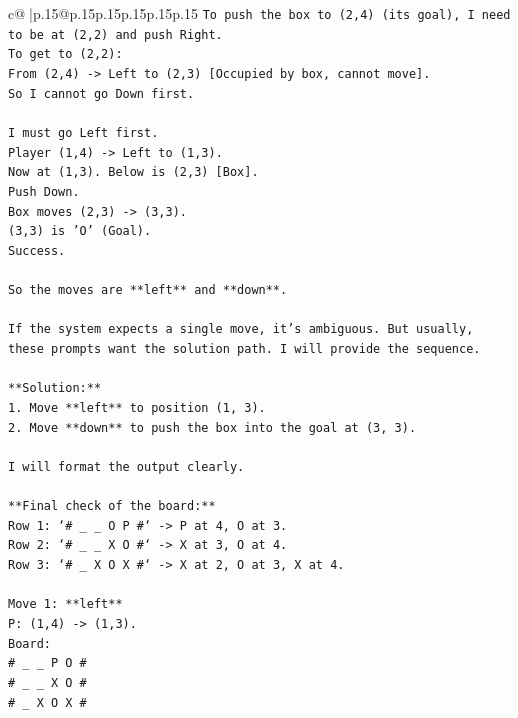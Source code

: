\documentclass{article}
\begin{document}
{\begin{supertabular}{c@{$\;$}|p{.15\linewidth}@{}p{.15\linewidth}p{.15\linewidth}p{.15\linewidth}p{.15\linewidth}p{.15\linewidth}}
{{{\texttt{To push the box to (2,4) (its goal), I need to be at (2,2) and push Right.} \\
\texttt{To get to (2,2):} \\
\texttt{From (2,4) {-}> Left to (2,3) {[}Occupied by box, cannot move{]}.} \\
\texttt{So I cannot go Down first.} \\
\\ 
\texttt{I must go Left first.} \\
\texttt{Player (1,4) {-}> Left to (1,3).} \\
\texttt{Now at (1,3). Below is (2,3) {[}Box{]}.} \\
\texttt{Push Down.} \\
\texttt{Box moves (2,3) {-}> (3,3).} \\
\texttt{(3,3) is 'O' (Goal).} \\
\texttt{Success.} \\
\\ 
\texttt{So the moves are **left** and **down**.} \\
\\ 
\texttt{If the system expects a single move, it's ambiguous. But usually, these prompts want the solution path. I will provide the sequence.} \\
\\ 
\texttt{**Solution:**} \\
\texttt{1. Move **left** to position (1, 3).} \\
\texttt{2. Move **down** to push the box into the goal at (3, 3).} \\
\\ 
\texttt{I will format the output clearly.} \\
\\ 
\texttt{**Final check of the board:**} \\
\texttt{Row 1: `\# \_ \_ O P \#` {-}> P at 4, O at 3.} \\
\texttt{Row 2: `\# \_ \_ X O \#` {-}> X at 3, O at 4.} \\
\texttt{Row 3: `\# \_ X O X \#` {-}> X at 2, O at 3, X at 4.} \\
\\ 
\texttt{Move 1: **left**} \\
\texttt{P: (1,4) {-}> (1,3).} \\
\texttt{Board:} \\
\texttt{\# \_ \_ P O \#} \\
\texttt{\# \_ \_ X O \#} \\
\texttt{\# \_ X O X \#} \\
}}}
\end{supertabular}}
\end{document}
